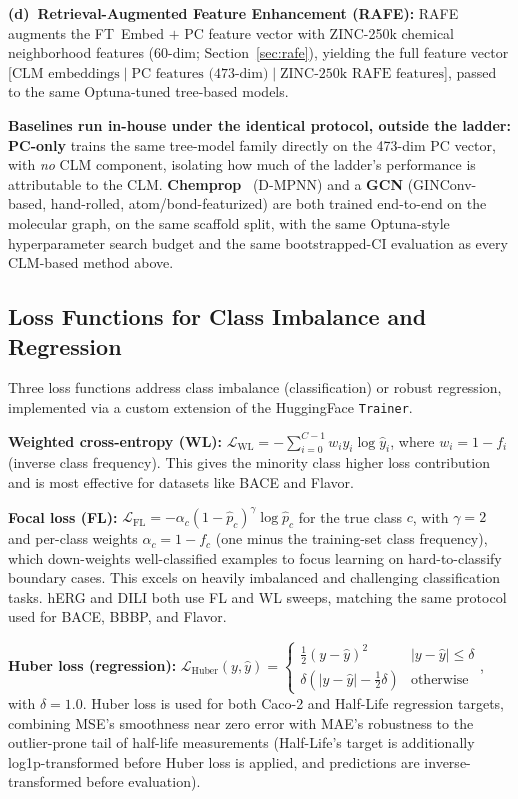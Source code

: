 \documentclass[pdflatex,sn-mathphys-num]{sn-jnl}%
\begin{document}
\textbf{(d)~Retrieval-Augmented Feature Enhancement (RAFE):} RAFE augments the FT~Embed $+$ PC feature vector with ZINC-250k chemical neighborhood features (60-dim; Section~\ref{sec:rafe}), yielding the full feature vector [$\text{CLM embeddings} \mid \text{PC features (473-dim)} \mid \text{ZINC-250k RAFE features}$], passed to the same Optuna-tuned tree-based models.

\textbf{Baselines run in-house under the identical protocol, outside the ladder:} \textbf{PC-only} trains the same tree-model family directly on the 473-dim PC vector, with \emph{no} CLM component, isolating how much of the ladder's performance is attributable to the CLM. \textbf{Chemprop}~\cite{yang2019chemprop} (D-MPNN) and a \textbf{GCN} (GINConv-based, hand-rolled, atom/bond-featurized) are both trained end-to-end on the molecular graph, on the same scaffold split, with the same Optuna-style hyperparameter search budget and the same bootstrapped-CI evaluation as every CLM-based method above.

\subsection{Loss Functions for Class Imbalance and Regression}\label{sec:loss_functions}
Three loss functions address class imbalance (classification) or robust regression, implemented via a custom extension of the HuggingFace \texttt{Trainer}.

\noindent \textbf{Weighted cross-entropy (WL):} $\mathcal{L}_{\text{WL}} = -\sum_{i=0}^{C-1} w_i y_i \log\hat{y}_i$, where $w_i = 1 - f_i$ (inverse class frequency). This gives the minority class higher loss contribution and is most effective for datasets like BACE and Flavor.

\noindent\textbf{Focal loss (FL):} $\mathcal{L}_{\text{FL}} = -\alpha_c (1 - \hat{p}_c)^\gamma \log\hat{p}_c$ for the true class $c$, with $\gamma = 2$ and per-class weights $\alpha_c = 1 - f_c$ (one minus the training-set class frequency), which down-weights well-classified examples to focus learning on hard-to-classify boundary cases. This excels on heavily imbalanced and challenging classification tasks. hERG and DILI both use FL and WL sweeps, matching the same protocol used for BACE, BBBP, and Flavor.

\noindent\textbf{Huber loss (regression):} $\mathcal{L}_{\text{Huber}}(y, \hat y) = \begin{cases}\tfrac{1}{2}(y-\hat y)^2 & |y - \hat y| \le \delta \\ \delta(|y-\hat y| - \tfrac12 \delta) & \text{otherwise}\end{cases}$, with $\delta = 1.0$. Huber loss is used for both Caco-2 and Half-Life regression targets, combining MSE's smoothness near zero error with MAE's robustness to the outlier-prone tail of half-life measurements (Half-Life's target is additionally log1p-transformed before Huber loss is applied, and predictions are inverse-transformed before evaluation).
\end{document}
